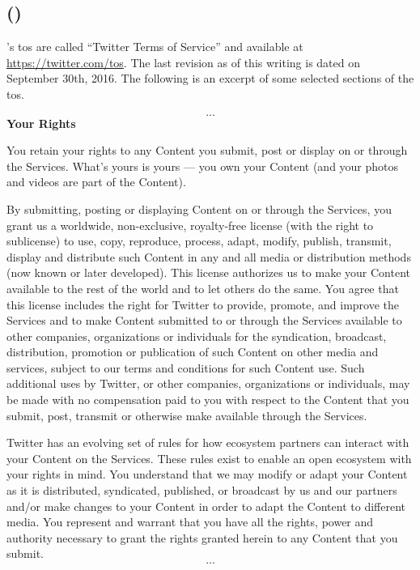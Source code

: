 \documentclass[showtrims,oldfontcommands]{kthesis}
\newcommand*\VerBar[1]{%
	\begin{tikzpicture}
	\fill[#1] (0,0)--(1,0)--(1,1)--(0,1)--cycle;
	\draw[white] (0.5,0.5)node{\rotatebox{-90}{\Huge \textbf \thechapter}};
	\end{tikzpicture}
}
\newcounter{DogearHShift}
\newcommand{\dogear}[1]{%
  \backgroundsetup{position={current page.north east},vshift=0.5cm,%
    hshift=-\theDogearHShift cm,contents={\VerBar{#1}}}%
  \BgThispage%
  \addtocounter{DogearHShift}{1}
}
\newcommand{\dogearRGB}[1]{%
  \definecolor{dogearColor}{RGB}{#1}%
  \dogear{dogearColor}%
}
\begin{document}
\begin{appendices}
    \section[\Twitter]{\Twitter (\TwitterInc)}
        \label{section:excerpts-twitter}
    \Twitter's \acs{tos} are called ``Twitter Terms of Service'' and available at 
    \url{https://twitter.com/tos}. The last revision as of 
    this writing is dated on September 30th, 2016. The following is an excerpt of some 
    selected sections of the \ac{tos}.

    \begin{quote_tos}
        \[...\]
        \textbf{Your Rights}
        
        You retain your rights to any Content you submit, post or display on or 
        through the Services. What’s yours is yours — you own your Content (and 
        your photos and videos are part of the Content).

        By submitting, posting or displaying Content on or through the Services, 
        you grant us a worldwide, non-exclusive, royalty-free license (with the 
        right to sublicense) to use, copy, reproduce, process, adapt, modify, publish, 
        transmit, display and distribute such Content in any and all media or distribution 
        methods (now known or later developed). This license authorizes us to make 
        your Content available to the rest of the world and to let others do the 
        same. You agree that this license includes the right for Twitter to provide, 
        promote, and improve the Services and to make Content submitted to or through 
        the Services available to other companies, organizations or individuals 
        for the syndication, broadcast, distribution, promotion or publication of 
        such Content on other media and services, subject to our terms and conditions 
        for such Content use. Such additional uses by Twitter, or other companies, 
        organizations or individuals, may be made with no compensation paid to you 
        with respect to the Content that you submit, post, transmit or otherwise 
        make available through the Services.

        Twitter has an evolving set of rules for how ecosystem partners can interact 
        with your Content on the Services. These rules exist to enable an open ecosystem 
        with your rights in mind. You understand that we may modify or adapt your 
        Content as it is distributed, syndicated, published, or broadcast by us and 
        our partners and/or make changes to your Content in order to adapt the Content 
        to different media. You represent and warrant that you have all the rights, 
        power and authority necessary to grant the rights granted herein to any 
        Content that you submit.
        \[...\]
    \end{quote_tos}

\end{appendices}




\end{document}
